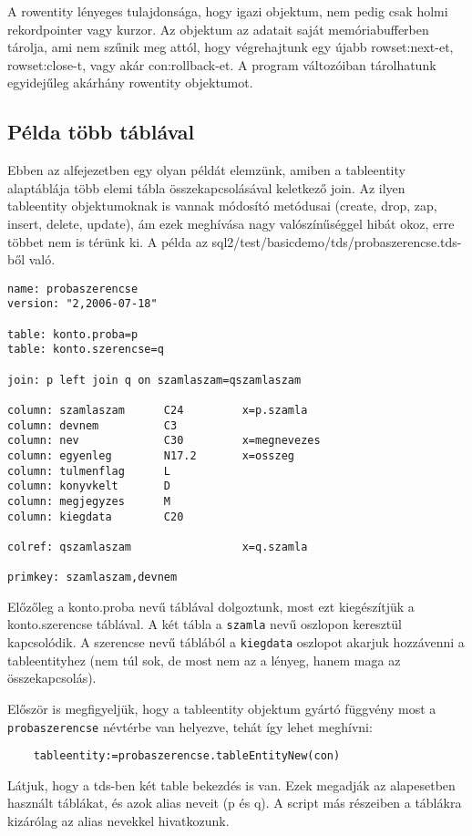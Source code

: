 A rowentity lényeges tulajdonsága, hogy igazi objektum,
nem pedig csak holmi rekordpointer vagy kurzor.
Az objektum az adatait  saját memóriabufferben tárolja, ami nem
szűnik meg attól, hogy végrehajtunk egy újabb rowset:next-et,
rowset:close-t, vagy akár con:rollback-et. A program változóiban
tárolhatunk egyidejűleg akárhány rowentity objektumot.










\subsection{Példa több táblával}

Ebben az alfejezetben egy olyan példát elemzünk,
amiben a tableentity alaptáblája több elemi tábla
összekapcsolásával keletkező join. Az ilyen tableentity
objektumoknak is vannak módosító metódusai
(create, drop, zap, insert, delete, update), 
ám ezek meghívása nagy valószínűséggel hibát okoz,
erre többet nem is térünk ki. 
A példa az sql2/test/basicdemo/tds/probaszerencse.tds-ből való.

\begin{verbatim}
name: probaszerencse
version: "2,2006-07-18"

table: konto.proba=p
table: konto.szerencse=q

join: p left join q on szamlaszam=qszamlaszam

column: szamlaszam      C24         x=p.szamla
column: devnem          C3
column: nev             C30         x=megnevezes
column: egyenleg        N17.2       x=osszeg
column: tulmenflag      L
column: konyvkelt       D
column: megjegyzes      M
column: kiegdata        C20

colref: qszamlaszam                 x=q.szamla

primkey: szamlaszam,devnem
\end{verbatim}

Előzőleg a konto.proba nevű táblával dolgoztunk, most ezt kiegészítjük
a konto.szerencse táblával. A két tábla a \verb!szamla! nevű oszlopon
keresztül kapcsolódik.  A szerencse nevű táblából a \verb!kiegdata! oszlopot
akarjuk hozzávenni a tableentityhez (nem túl sok, de most nem az a lényeg,
hanem maga az összekapcsolás). 

Először is megfigyeljük, hogy a tableentity objektum gyártó
függvény most a \verb!probaszerencse! névtérbe van helyezve, 
tehát így lehet meghívni:
\begin{verbatim}
    tableentity:=probaszerencse.tableEntityNew(con)
\end{verbatim}
Látjuk, hogy a tds-ben két table bekezdés is van.
Ezek megadják az alapesetben használt táblákat, és azok
alias neveit (p és q). A script más részeiben a táblákra
kizárólag az alias nevekkel hivatkozunk.

